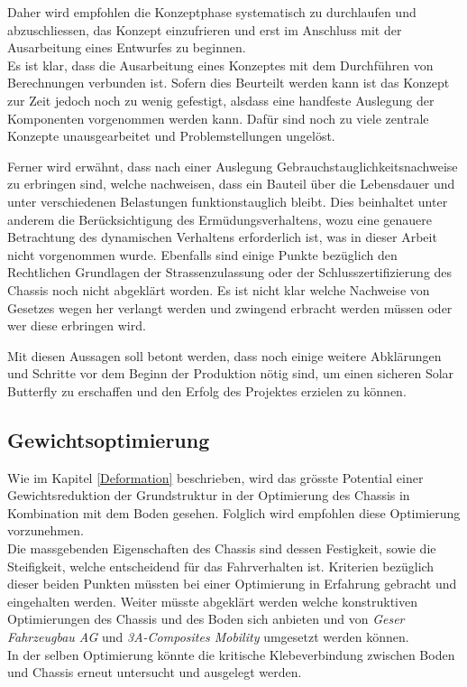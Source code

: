 Daher wird empfohlen die Konzeptphase systematisch zu durchlaufen und abzuschliessen, das Konzept einzufrieren und erst im Anschluss mit der Ausarbeitung eines Entwurfes zu beginnen.\\
Es ist klar, dass die Ausarbeitung eines Konzeptes mit dem Durchführen von Berechnungen verbunden ist. Sofern dies Beurteilt werden kann ist das Konzept zur Zeit jedoch noch zu wenig gefestigt, alsdass eine handfeste Auslegung der Komponenten vorgenommen werden kann. Dafür sind noch zu viele zentrale Konzepte unausgearbeitet und Problemstellungen ungelöst.

Ferner wird erwähnt, dass nach einer Auslegung Gebrauchstauglichkeitsnachweise zu erbringen sind, welche nachweisen, dass ein Bauteil über die Lebensdauer und unter verschiedenen Belastungen funktionstauglich bleibt. Dies beinhaltet unter anderem die Berücksichtigung des Ermüdungsverhaltens, wozu eine genauere Betrachtung des dynamischen Verhaltens erforderlich ist, was in dieser Arbeit nicht vorgenommen wurde.
Ebenfalls sind einige Punkte bezüglich den Rechtlichen Grundlagen der Strassenzulassung oder der Schlusszertifizierung des Chassis noch nicht abgeklärt worden. Es ist nicht klar welche Nachweise von Gesetzes wegen her verlangt werden und zwingend erbracht werden müssen oder wer diese erbringen wird.

Mit diesen Aussagen soll betont werden, dass noch einige weitere Abklärungen und Schritte vor dem Beginn der Produktion nötig sind, um einen sicheren Solar Butterfly zu erschaffen und den Erfolg des Projektes erzielen zu können.

\subsection{Gewichtsoptimierung}
Wie im Kapitel \ref{Deformation} beschrieben, wird das grösste Potential einer Gewichtsreduktion der Grundstruktur in der Optimierung des Chassis in Kombination mit dem Boden gesehen. Folglich wird empfohlen diese Optimierung vorzunehmen.\\
Die massgebenden Eigenschaften des Chassis sind dessen Festigkeit, sowie die Steifigkeit, welche entscheidend für das Fahrverhalten ist. Kriterien bezüglich dieser beiden Punkten müssten bei einer Optimierung in Erfahrung gebracht und eingehalten werden. Weiter müsste abgeklärt werden welche konstruktiven Optimierungen des Chassis und des Boden sich anbieten und von \emph{Geser Fahrzeugbau AG} und \emph{3A-Composites Mobility} umgesetzt werden können.\\
In der selben Optimierung könnte die kritische Klebeverbindung zwischen Boden und Chassis erneut untersucht und ausgelegt werden.

